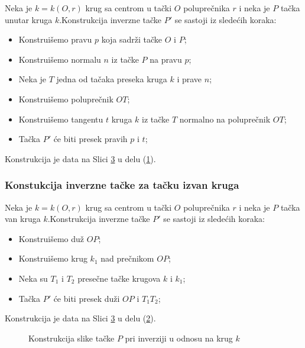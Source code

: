 \documentclass[a4paper,12pt]{article}
\theoremstyle{definition}
\begin{document}
Neka je $k=k(O,r)$ krug sa centrom u ta\v{c}ki $O$ polupre\v{c}nika $r$ i neka je $P$ ta\v{c}ka unutar kruga $k$.Konstrukcija inverzne ta\v{c}ke $P'$ se sastoji iz slede\'{c}ih koraka:
\begin{itemize}
    \item Konstrui\v{s}emo pravu $p$ koja sadr\v{z}i ta\v{c}ke $O$ i $P$;
    \item Konstrui\v{s}emo normalu $n$ iz ta\v{c}ke $P$ na pravu $p$;
    \item Neka je $T$ jedna od ta\v{c}aka preseka kruga $k$ i prave $n$;
    \item Konstrui\v{s}emo polupre\v{c}nik $OT$;
    \item Konstrui\v{s}emo tangentu $t$ kruga $k$ iz ta\v{c}ke $T$ normalno na polupre\v{c}nik $OT$;
    \item Ta\v{c}ka $P'$ \'{c}e biti presek pravih $p$ i $t$; 

\end{itemize}
Konstrukcija je data na Slici \ref{slk:konstrukcija} u delu (\ref{slk:unutar}).

\subsubsection*{Konstukcija inverzne ta\v{c}ke za ta\v{c}ku izvan kruga}

Neka je $k=k(O,r)$ krug sa centrom u ta\v{c}ki $O$ polupre\v{c}nika $r$ i neka je $P$ ta\v{c}ka van kruga $k$.Konstrukcija inverzne ta\v{c}ke $P'$ se sastoji iz slede\'{c}ih koraka:
\begin{itemize}
    \item Konstrui\v{s}emo du\v{z} $OP$;
    \item Konstrui\v{s}emo krug $k_1$ nad pre\v{c}nikom $OP$;
    \item Neka su $T_1$ i $T_2$ prese\v{c}ne ta\v{c}ke krugova $k$ i $k_1$;
    \item Ta\v{c}ka $P'$ \'{c}e biti presek du\v{z}i $OP$ i $T_1T_2$; 
\end{itemize}
Konstrukcija je data na Slici \ref{slk:konstrukcija} u delu (\ref{slk:van}).\\

\begin{figure}[h!]
	\begin{subfigure}{80mm}
		
		\label{slk:unutar}
	\end{subfigure}
	\begin{subfigure}{80mm}
		
		\label{slk:van}
	\end{subfigure}
\caption{Konstrukcija slike ta\v{c}ke $P$ pri inverziji u odnosu na krug $k$}
\label{slk:konstrukcija}
\end{figure}
\end{document}
